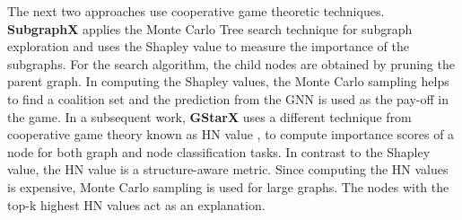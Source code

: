 The next two approaches use cooperative game theoretic techniques. \textbf{SubgraphX} \cite{subgraphX} applies the Monte Carlo Tree search technique for subgraph exploration and uses the Shapley value \cite{Shap_val} to measure the importance of the subgraphs. For the search algorithm, the child nodes are obtained by pruning the parent graph. In computing the Shapley values, the Monte Carlo sampling helps to find a coalition set and the prediction from the GNN is used as the pay-off in the game. In a subsequent work, \textbf{GStarX} \cite{gstarx} uses a different technique from cooperative game theory known as HN value \cite{HN-val}, to compute importance scores of a node for both graph and node classification tasks. In contrast to the Shapley value, the HN value is a structure-aware metric. Since computing the HN values is expensive, Monte Carlo sampling is used for large graphs. The nodes with the top-k highest HN values act as an explanation.
 
 
